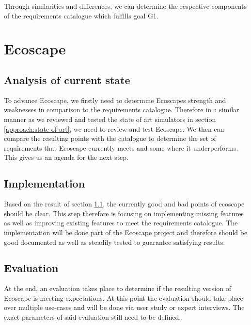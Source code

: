 Through similarities and differences, we can determine the respective components of the requirements catalogue which fulfills goal G1.

\section{Ecoscape}\label{approach:ecoscape}
\subsection{Analysis of current state}\label{approach:ecoscape-current-state}
To advance Ecoscape, we firstly need to determine Ecoscapes strength and weaknesses in comparison to the requirements catalogue. 
Therefore in a similar manner as we reviewed and tested the state of art simulators in section \ref{approach:state-of-art}, we need to review and test Ecoscape.
We then can compare the resulting points with the catalogue to determine the set of requirements that Ecoscape currently meets and some where it underperforms.
This gives us an agenda for the next step.

\subsection{Implementation}\label{approach:ecoscape-implementation}
Based on the result of section \ref{approach:ecoscape-current-state}, the currently good and bad points of ecoscape should be clear. This step therefore is focusing on implementing missing features as well as improving existing features 
to meet the requirements catalogue.
The implementation will be done part of the Ecoscape project and therefore should be good documented as well as steadily tested to guarantee satisfying results. 

\subsection{Evaluation}\label{approach:ecoscape-evaluation}
At the end, an evaluation takes place to determine if the resulting version of Ecoscape is meeting expectations. At this point the evaluation should take place over multiple use-cases and will be done via user study or expert interviews.
The exact parameters of said evaluation still need to be defined.
